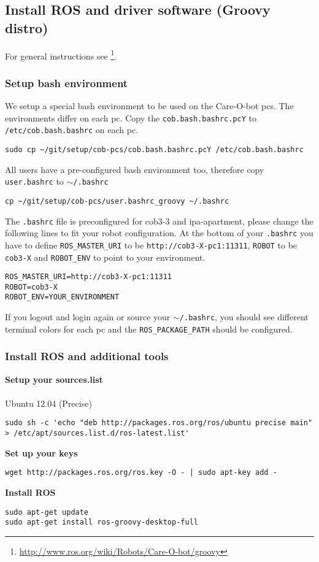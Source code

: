\subsection{Install ROS and driver software (Groovy distro)}
For general instructions see \footnote{\url{http://www.ros.org/wiki/Robots/Care-O-bot/groovy}}.

\subsubsection{Setup bash environment}
We setup a special bash environment to be used on the Care-O-bot pcs. The environments differ on each pc. Copy the \texttt{cob.bash.bashrc.pcY} to \texttt{/etc/cob.bash.bashrc} on each pc.

\begin{lstlisting}
sudo cp ~/git/setup/cob-pcs/cob.bash.bashrc.pcY /etc/cob.bash.bashrc
\end{lstlisting}

All users have a pre-configured bash environment too, therefore copy \texttt{user.bashrc} to \texttt{$\sim$/.bashrc}
\begin{lstlisting}
cp ~/git/setup/cob-pcs/user.bashrc_groovy ~/.bashrc
\end{lstlisting}
The \texttt{.bashrc} file is preconfigured for cob3-3 and ipa-apartment, please change the following lines to fit your robot configuration. At the bottom of your \texttt{.bashrc} you have to define \texttt{ROS\_MASTER\_URI} to be \texttt{http://cob3-X-pc1:11311}, \texttt{ROBOT} to be \texttt{cob3-X} and \texttt{ROBOT\_ENV} to point to your environment.
\begin{lstlisting}
ROS_MASTER_URI=http://cob3-X-pc1:11311
ROBOT=cob3-X
ROBOT_ENV=YOUR_ENVIRONMENT
\end{lstlisting}

If you logout and login again or source your \texttt{$\sim$/.bashrc}, you should see different terminal colors for each pc and the \texttt{ROS\_PACKAGE\_PATH} should be configured. 

\subsubsection{Install ROS and additional tools}


\textbf{Setup your sources.list}
\\
\\Ubuntu 12.04 (Precise)
\begin{lstlisting}
sudo sh -c 'echo "deb http://packages.ros.org/ros/ubuntu precise main" > /etc/apt/sources.list.d/ros-latest.list'
\end{lstlisting}
\textbf{Set up your keys}
\begin{lstlisting}
wget http://packages.ros.org/ros.key -O - | sudo apt-key add -
\end{lstlisting}
\textbf{Install ROS}
\begin{lstlisting}
sudo apt-get update
sudo apt-get install ros-groovy-desktop-full
\end{lstlisting}

